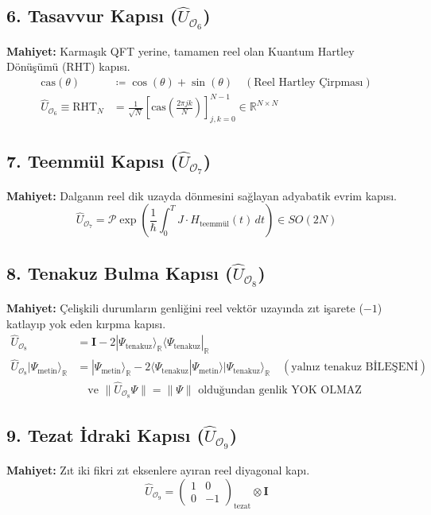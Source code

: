 \documentclass[11pt, a4paper]{article}
\begin{document}
\subsection{6. Tasavvur Kapısı ($\hat{U}_{\mathcal{O}_6}$)}
\textbf{Mahiyet:} Karmaşık QFT yerine, tamamen reel olan Kuantum Hartley Dönüşümü (RHT) kapısı.
\begin{align}
\text{cas}(\theta) &\coloneqq \cos(\theta) + \sin(\theta) \quad (\text{Reel Hartley Çirpması}) \\
\hat{U}_{\mathcal{O}_6} \equiv \text{RHT}_N &= \frac{1}{\sqrt{N}} \left[ \text{cas}\left( \frac{2\pi j k}{N} \right) \right]_{j,k=0}^{N-1} \in \mathbb{R}^{N \times N}
\end{align}

\subsection{7. Teemmül Kapısı ($\hat{U}_{\mathcal{O}_7}$)}
\textbf{Mahiyet:} Dalganın reel dik uzayda dönmesini sağlayan adyabatik evrim kapısı.
\begin{equation}
\hat{U}_{\mathcal{O}_7} = \mathcal{P} \exp\left( \frac{1}{\hbar} \int_0^T J \cdot H_{\text{teemmül}}(t) \, dt \right) \in SO(2N)
\end{equation}

\subsection{8. Tenakuz Bulma Kapısı ($\hat{U}_{\mathcal{O}_8}$)}
\textbf{Mahiyet:} Çelişkili durumların genliğini reel vektör uzayında zıt işarete ($-1$) katlayıp yok eden kırpma kapısı.
\begin{align}
\hat{U}_{\mathcal{O}_8} &= \mathbf{I} - 2 |\Psi_{\text{tenakuz}}\rangle_{\mathbb{R}} \langle \Psi_{\text{tenakuz}}|_{\mathbb{R}} \\
\hat{U}_{\mathcal{O}_8} |\Psi_{\text{metin}}\rangle_{\mathbb{R}} &= |\Psi_{\text{metin}}\rangle_{\mathbb{R}} - 2 \langle \Psi_{\text{tenakuz}} | \Psi_{\text{metin}} \rangle |\Psi_{\text{tenakuz}}\rangle_{\mathbb{R}} \quad (\text{yalnız tenakuz BİLEŞENİ}) \\ &\quad \text{ve } \| \hat{U}_{\mathcal{O}_8} \Psi \| = \| \Psi \| \text{ olduğundan genlik YOK OLMAZ}
\end{align}

\subsection{9. Tezat İdraki Kapısı ($\hat{U}_{\mathcal{O}_9}$)}
\textbf{Mahiyet:} Zıt iki fikri zıt eksenlere ayıran reel diyagonal kapı.
\begin{equation}
\hat{U}_{\mathcal{O}_9} = \begin{pmatrix} 1 & 0 \\ 0 & -1 \end{pmatrix}_{\text{tezat}} \otimes \mathbf{I}
\end{equation}
\end{document}
